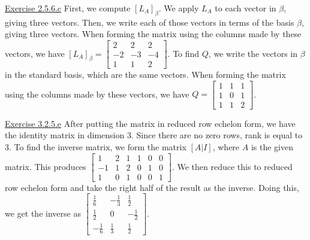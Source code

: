 \documentclass{exam}
\begin{document}
\underline{Exercise 2.5.6.c}
\newline
\newline
First, we compute $[L_A]_\beta$. We apply $L_A$ to each vector in $\beta$, giving three vectors. Then, we write each of those vectors in terms of the basis $\beta$, giving three vectors. When forming the matrix using the columns made by these vectors, we have $[L_A]_\beta=
\begin{bmatrix}
    2 & 2 & 2 \\
    -2 & -3 & -4 \\
    1 & 1 & 2
\end{bmatrix}$. To find $Q$, we write the vectors in $\beta$ in the standard basis, which are the same vectors. When forming the matrix using the columns made by these vectors, we have $Q=
\begin{bmatrix}
    1 & 1 & 1 \\
    1 & 0 & 1 \\
    1 & 1 & 2
\end{bmatrix}$.
\newline

\underline{Exercise 3.2.5.e}
\newline
\newline
After putting the matrix in reduced row echelon form, we have the identity matrix in dimension 3. Since there are no zero rows, rank is equal to 3. To find the inverse matrix, we form the matrix $[A|I]$, where $A$ is the given matrix. This produces $
\begin{bmatrix}
    1 & 2 & 1 & 1 & 0 & 0 \\
    -1 & 1 & 2 & 0 & 1 & 0 \\
    1 & 0 & 1 & 0 & 0 & 1
\end{bmatrix}$. We then reduce this to reduced row echelon form and take the right half of the result as the inverse. Doing this, we get the inverse as $
\begin{bmatrix}
    \frac{1}{6} & -\frac{1}{3} & \frac{1}{2} \\
    \frac{1}{2} & 0 & -\frac{1}{2} \\
    -\frac{1}{6} & \frac{1}{3} & \frac{1}{2} 
\end{bmatrix}$.
\newline
\end{document}
